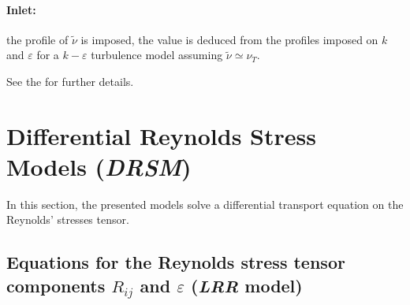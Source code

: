 \paragraph{Inlet:}
the profile of $\tilde{\nu}$ is imposed, the value is deduced from the profiles imposed on $k$ and $\varepsilon$ for a $k-\varepsilon$ turbulence
model assuming $\tilde{\nu } \simeq \nu_T$.

See the  for further details.

\section{Differential Reynolds Stress Models (\emph{DRSM})}
In this section, the presented models solve a differential transport equation
on the Reynolds' stresses tensor.
\subsection{Equations for the Reynolds stress tensor components $R_{ij}$
and $\varepsilon$ (\emph{LRR} model)}
%

